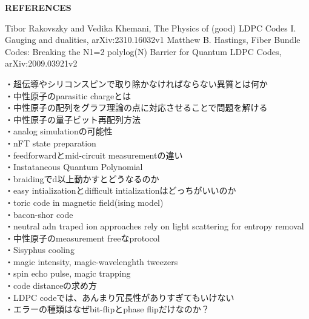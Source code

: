 \documentclass[a4paper,10.5pt]{ltjsarticle}
\begin{document}
\clearpage
{\Large \bfseries REFERENCES}
\begin{thebibliography}{1}
\vspace{-1.5cm}
   Tibor Rakovszky and Vedika Khemani, The Physics of (good) LDPC Codes I. Gauging and dualities, arXiv:2310.16032v1
   Matthew B. Hastings, Fiber Bundle Codes: Breaking the N1=2 polylog(N) Barrier for Quantum LDPC Codes, arXiv:2009.03921v2
\end{thebibliography}
\vspace{50pt}
・超伝導やシリコンスピンで取り除かなければならない異質とは何か\\
・中性原子のparasitic chargeとは\\
・中性原子の配列をグラフ理論の点に対応させることで問題を解ける\\
・中性原子の量子ビット再配列方法\\
・analog simulationの可能性\\
・nFT state preparation\\
・feedforwardとmid-circuit measurementの違い\\
・Instataneous Quantum Polynomial\\
・braidingでd以上動かすとどうなるのか\\
・easy intializationとdifficult intializationはどっちがいいのか\\
・toric code in magnetic field(ising model)\\
・bacon-shor code\\
・neutral adn traped ion approaches rely on light scattering for entropy removal\\
・中性原子のmeasurement freeなprotocol\\
・Sisyphus cooling\\
・magic intensity, magic-wavelenghth tweezers\\
・spin echo pulse, magic trapping\\
・code distanceの求め方\\
・LDPC codeでは、あんまり冗長性がありすぎてもいけない\\
・エラーの種類はなぜbit-flipとphase flipだけなのか？\\
\\
\end{document}
